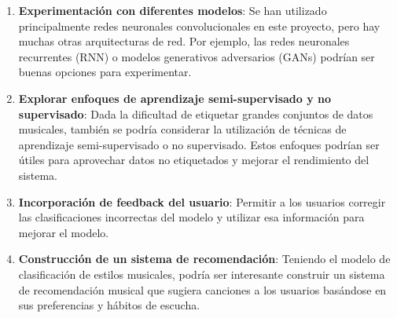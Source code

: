 \begin{enumerate}
\item \textbf{Experimentación con diferentes modelos}: Se han utilizado principalmente redes neuronales convolucionales en este proyecto, pero hay muchas otras arquitecturas de red. Por ejemplo, las redes neuronales recurrentes (RNN) o modelos generativos adversarios (GANs) podrían ser buenas opciones para experimentar.

\item \textbf{Explorar enfoques de aprendizaje semi-supervisado y no supervisado}: Dada la dificultad de etiquetar grandes conjuntos de datos musicales, también se podría considerar la utilización de técnicas de aprendizaje semi-supervisado o no supervisado. Estos enfoques podrían ser útiles para aprovechar datos no etiquetados y mejorar el rendimiento del sistema.

\item \textbf{Incorporación de feedback del usuario}: Permitir a los usuarios corregir las clasificaciones incorrectas del modelo y utilizar esa información para mejorar el modelo.

\item \textbf{Construcción de un sistema de recomendación}: Teniendo el modelo de clasificación de estilos musicales, podría ser interesante construir un sistema de recomendación musical que sugiera canciones a los usuarios basándose en sus preferencias y hábitos de escucha.
\end{enumerate}